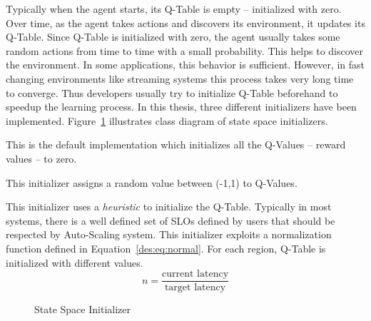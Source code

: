 Typically when the agent starts, its Q-Table is empty -- initialized with zero. Over time, as the agent takes actions and discovers its environment, it updates its Q-Table. Since Q-Table is initialized with zero, the agent usually takes some random actions from time to time with a small probability. This helps to discover the environment. In some applications, this behavior is sufficient. However, in fast changing environments like streaming systems this process takes very long time to converge. Thus developers usually try to initialize Q-Table beforehand to speedup the learning process. In this thesis, three different initializers have been implemented. Figure~\ref{des:f:ss-init} illustrates class diagram of state space initializers.
\begin{description}[leftmargin=0pt,nolistsep]
\item[Zero Initializer] This is the default implementation which initializes all the Q-Values -- reward values -- to zero.
\item[Random Initializer] This initializer assigns a random value between (-1,1) to Q-Values.
\item[Optimized Initializer] This initializer uses a \emph{heuristic} to initialize the Q-Table. Typically in most systems, there is a well defined set of SLOs defined by users that should be respected by Auto-Scaling system. This initializer exploits a normalization function defined in Equation~\ref{des:eq:normal}.  For each region, Q-Table is initialized with different values.
\begin{equation}
n = \frac{\text{current latency}}{\text{target latency}}
\label{des:eq:normal}
\end{equation}
\end{description}
\begin{figure}[H]
    \centering
    \resizebox{0.8\textwidth}{!} {
    }
    \caption{State Space Initializer}
    \label{des:f:ss-init}
\end{figure}

